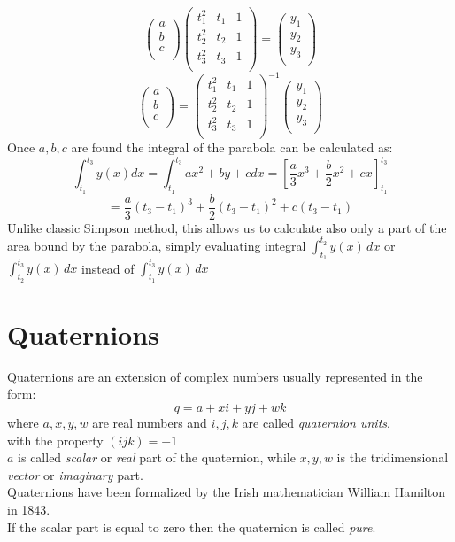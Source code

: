 $$ 
\begin{pmatrix}
a \\
b \\
c \\
\end{pmatrix}
\begin{pmatrix}
t_1^2 & t_1 & 1 \\
t_2^2 & t_2 & 1 \\
t_3^2 & t_3 & 1 \\
\end{pmatrix}
=
\begin{pmatrix}
y_1 \\
y_2 \\
y_3 \\
\end{pmatrix}
$$
$$ 
\begin{pmatrix}
a \\
b \\
c \\
\end{pmatrix}
=
\begin{pmatrix}
t_1^2 & t_1 & 1 \\
t_2^2 & t_2 & 1 \\
t_3^2 & t_3 & 1 \\
\end{pmatrix}^{-1}
\begin{pmatrix}
y_1 \\
y_2 \\
y_3 \\
\end{pmatrix}
$$
Once $a,b,c$ are found the integral of the parabola can be calculated as:
$$
\int_{t_1}^{t_3} y(x)dx = \int_{t_1}^{t_3} ax^2 + by + c dx = \left[\frac{a}{3}x^3+\frac{b}{2}x^2+c{x}\right]_{t_1}^{t_3} 
$$
$$= \frac{a}{3}(t_3-t_1)^3+\frac{b}{2}(t_3-t_1)^2+c(t_3-t_1)$$
Unlike classic Simpson method, this allows us to calculate also only a part of the area bound by the parabola, simply evaluating integral $\int_{t_1}^{t_2} y(x)\,dx$ or $\int_{t_2}^{t_3} y(x)\,dx$ instead of $\int_{t_1}^{t_3} y(x)\,dx $

\section{Quaternions}
Quaternions are an extension of complex numbers usually represented in the form:
$$ q = a + xi + yj + wk $$
where $a, x, y, w$ are real numbers and $i, j, k$ are called \textit{quaternion units}. \\
with the property ${(ijk)=-1}$  \\
$a$ is called \textit{scalar} or \textit{real} part of the quaternion, while $x,y,w$ is the tridimensional \textit{vector} or \textit{imaginary} part. \cite{amslaurea6701} \\
Quaternions have been formalized by the Irish mathematician William Hamilton in 1843. \\
If the scalar part is equal to zero then the quaternion is called \textit{pure}.

